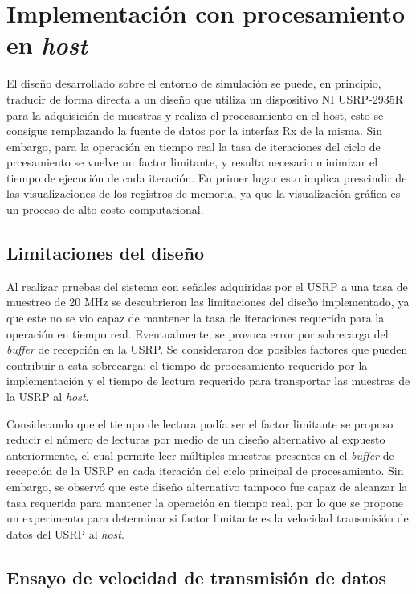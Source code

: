 \section{Implementación con procesamiento en \textit{host}}

El diseño desarrollado sobre el entorno de simulación se puede, en principio, traducir de forma directa a un diseño que utiliza un dispositivo NI USRP-2935R para la adquisición de muestras y realiza el procesamiento en el host, esto se consigue remplazando la fuente de datos por la interfaz Rx de la misma. Sin embargo, para la operación en tiempo real la tasa de iteraciones del ciclo de prcesamiento se vuelve un factor limitante, y resulta necesario minimizar el tiempo de ejecución de cada iteración. En primer lugar esto implica prescindir de las visualizaciones de los registros de memoria, ya que la visualización gráfica es un proceso de alto costo computacional.

\subsection{Limitaciones del diseño}

Al realizar pruebas del sistema con señales adquiridas por el USRP a una tasa de muestreo de 20 MHz se descubrieron las limitaciones del diseño implementado, ya que este no se vio capaz de mantener la tasa de iteraciones requerida para la operación en tiempo real. Eventualmente, se provoca error por sobrecarga del \textit{buffer} de recepción en la USRP. Se consideraron dos posibles factores que pueden contribuir a esta sobrecarga: el tiempo de procesamiento requerido por la implementación y el tiempo de lectura requerido para transportar las muestras de la USRP al \textit{host}. 

Considerando que el tiempo de lectura podía ser el factor limitante se propuso reducir el número de lecturas por medio de un diseño alternativo al expuesto anteriormente, el cual permite leer múltiples muestras presentes en el \textit{buffer} de recepción de la USRP en cada iteración del ciclo principal de procesamiento. Sin embargo, se observó que este diseño alternativo tampoco fue capaz de alcanzar la tasa requerida para mantener la operación en tiempo real, por lo que se \color{Green} propone un experimento para determinar si factor limitante es la velocidad transmisión de datos del USRP al \textit{host}. 

\subsection{Ensayo de velocidad de transmisión de datos}

